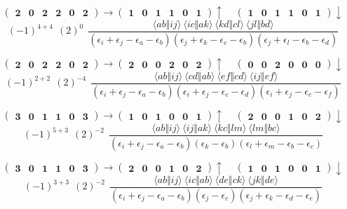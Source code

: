 \documentclass[12pt,oneside,a4paper,fleqn]{article}
\begin{document}
\[ \boldsymbol{ \begin{pmatrix} 2 & 0 & 2 & 2 & 0 & 2 \end{pmatrix} \rightarrow \begin{pmatrix} 1 & 0 & 1 & 1 & 0 & 1 \end{pmatrix} \uparrow~~~~~\begin{pmatrix} 1 & 0 & 1 & 1 & 0 & 1 \end{pmatrix} \downarrow } \]
$$(-1)^{4+4}~~(2)^{0}~~\frac{\langle ab \Vert ij \rangle ~\langle ic \Vert ak \rangle ~\langle kd \Vert cl \rangle ~\langle jl \Vert bd \rangle }{(\epsilon_i +\epsilon_j -\epsilon_a -\epsilon_b ) (\epsilon_j +\epsilon_k -\epsilon_c -\epsilon_b ) (\epsilon_j +\epsilon_l -\epsilon_b -\epsilon_d ) }$$

\[ \boldsymbol{ \begin{pmatrix} 2 & 0 & 2 & 2 & 0 & 2 \end{pmatrix} \rightarrow \begin{pmatrix} 2 & 0 & 0 & 2 & 0 & 2 \end{pmatrix} \uparrow~~~~~\begin{pmatrix} 0 & 0 & 2 & 0 & 0 & 0 \end{pmatrix} \downarrow } \]
$$(-1)^{2+2}~~(2)^{-4}~~\frac{\langle ab \Vert ij \rangle ~\langle cd \Vert ab \rangle ~\langle ef \Vert cd \rangle ~\langle ij \Vert ef \rangle }{(\epsilon_i +\epsilon_j -\epsilon_a -\epsilon_b ) (\epsilon_i +\epsilon_j -\epsilon_c -\epsilon_d ) (\epsilon_i +\epsilon_j -\epsilon_e -\epsilon_f ) }$$

\[ \boldsymbol{ \begin{pmatrix} 3 & 0 & 1 & 1 & 0 & 3 \end{pmatrix} \rightarrow \begin{pmatrix} 1 & 0 & 1 & 0 & 0 & 1 \end{pmatrix} \uparrow~~~~~\begin{pmatrix} 2 & 0 & 0 & 1 & 0 & 2 \end{pmatrix} \downarrow } \]
$$(-1)^{5+3}~~(2)^{-2}~~\frac{\langle ab \Vert ij \rangle ~\langle ij \Vert ak \rangle ~\langle kc \Vert lm \rangle ~\langle lm \Vert bc \rangle }{(\epsilon_i +\epsilon_j -\epsilon_a -\epsilon_b ) (\epsilon_k -\epsilon_b ) (\epsilon_l +\epsilon_m -\epsilon_b -\epsilon_c ) }$$

\[ \boldsymbol{ \begin{pmatrix} 3 & 0 & 1 & 1 & 0 & 3 \end{pmatrix} \rightarrow \begin{pmatrix} 2 & 0 & 0 & 1 & 0 & 2 \end{pmatrix} \uparrow~~~~~\begin{pmatrix} 1 & 0 & 1 & 0 & 0 & 1 \end{pmatrix} \downarrow } \]
$$(-1)^{3+3}~~(2)^{-2}~~\frac{\langle ab \Vert ij \rangle ~\langle ic \Vert ab \rangle ~\langle de \Vert ck \rangle ~\langle jk \Vert de \rangle }{(\epsilon_i +\epsilon_j -\epsilon_a -\epsilon_b ) (\epsilon_j -\epsilon_c ) (\epsilon_j +\epsilon_k -\epsilon_d -\epsilon_e ) }$$
\end{document}
